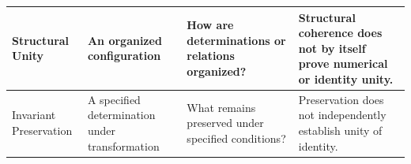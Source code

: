\begin{table}[htbp]
\begin{tabular}{|>{\raggedright\arraybackslash}p{2.8cm}|>{\raggedright\arraybackslash}p{3.3cm}|>{\raggedright\arraybackslash}p{3.5cm}|>{\raggedright\arraybackslash}p{4.5cm}|}
Structural Unity &
An organized configuration &
How are determinations or relations organized? &
Structural coherence does not by itself prove numerical or identity unity.
\\
\hline

Invariant Preservation &
A specified determination under transformation &
What remains preserved under specified conditions? &
Preservation does not independently establish unity of identity.
\\
\hline

\end{tabular}
\end{table}


